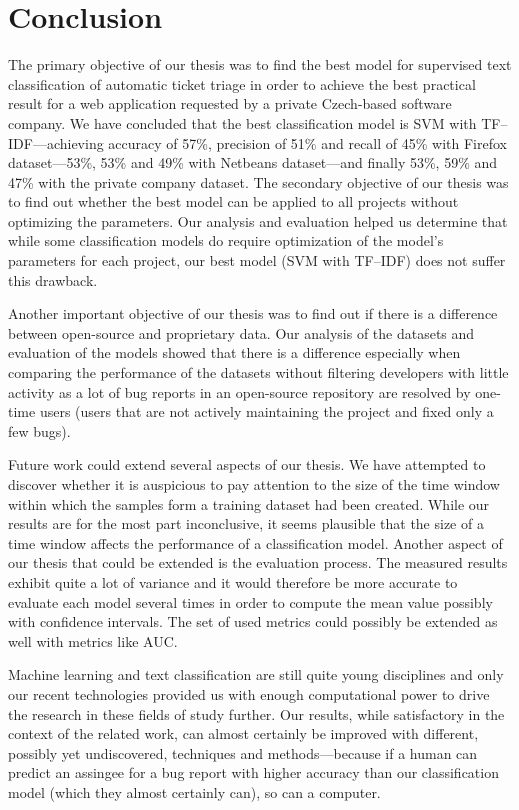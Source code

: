 \chapter{Conclusion}

The primary objective of our thesis was to find the best model for supervised text classification of automatic ticket triage in order to achieve the best practical result for a web application requested by a private Czech-based software company. We have concluded that the best classification model is SVM with TF--IDF---achieving accuracy of 57\%, precision of 51\% and recall of 45\% with Firefox dataset---53\%, 53\% and 49\% with Netbeans dataset---and finally 53\%, 59\% and 47\% with the private company dataset. The secondary objective of our thesis was to find out whether the best model can be applied to all projects without optimizing the parameters. Our analysis and evaluation helped us determine that while some classification models do require optimization of the model's parameters for each project, our best model (SVM with TF--IDF) does not suffer this drawback.

Another important objective of our thesis was to find out if there is a difference between open-source and proprietary data. Our analysis of the datasets and evaluation of the models showed that there is a difference especially when comparing the performance of the datasets without filtering developers with little activity as a lot of bug reports in an open-source repository are resolved by one-time users (users that are not actively maintaining the project and fixed only a few bugs).

Future work could extend several aspects of our thesis. We have attempted to discover whether it is auspicious to pay attention to the size of the time window within which the samples form a training dataset had been created. While our results are for the most part inconclusive, it seems plausible that the size of a time window affects the performance of a classification model. Another aspect of our thesis that could be extended is the evaluation process. The measured results exhibit quite a lot of variance and it would therefore be more accurate to evaluate each model several times in order to compute the mean value possibly with confidence intervals. The set of used metrics could possibly be extended as well with metrics like AUC.

Machine learning and text classification are still quite young disciplines and only our recent technologies provided us with enough computational power to drive the research in these fields of study further. Our results, while satisfactory in the context of the related work, can almost certainly be improved with different, possibly yet undiscovered, techniques and methods---because if a human can predict an assingee for a bug report with higher accuracy than our classification model (which they almost certainly can), so can a computer.

